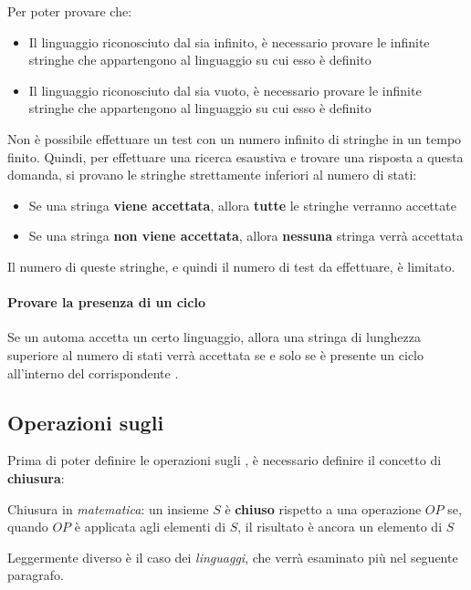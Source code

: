 \documentclass[italian, 10pt]{article}
\begin{document}
Per poter provare che:

\begin{itemize}
  \item Il linguaggio riconosciuto dal \FSA sia infinito, è necessario provare le infinite stringhe che appartengono al linguaggio su cui esso è definito
  \item Il linguaggio riconosciuto dal \FSA sia vuoto, è necessario provare le infinite stringhe che appartengono al linguaggio su cui esso è definito
\end{itemize}

Non è possibile effettuare un test con un numero infinito di stringhe in un tempo finito.
Quindi, per effettuare una ricerca esaustiva e trovare una risposta a questa domanda, si provano le stringhe strettamente inferiori al numero di stati:

\begin{itemize}[label=\(\Rightarrow\)]
  \item Se una stringa \textbf{viene accettata}, allora \textbf{tutte} le stringhe verranno accettate
  \item Se una stringa \textbf{non viene accettata}, allora \textbf{nessuna} stringa verrà accettata
\end{itemize}

Il numero di queste stringhe, e quindi il numero di test da effettuare, è limitato.

\paragraph{Provare la presenza di un ciclo}

Se un automa accetta un certo linguaggio, allora una stringa di lunghezza superiore al numero di stati verrà accettata se e solo se è presente un ciclo all'interno del corrispondente \FSA.

\subsection{Operazioni sugli \FSA}

Prima di poter definire le operazioni sugli \FSA, è necessario definire il concetto di \textbf{chiusura}:

Chiusura in \textit{matematica}: un insieme \(S\) è \textbf{chiuso} rispetto a una operazione \(OP\) se, quando \(OP\) è applicata agli elementi di \(S\), il risultato è ancora un elemento di \(S\)

Leggermente diverso è il caso dei \textit{linguaggi}, che verrà esaminato più nel seguente paragrafo.
\end{document}
